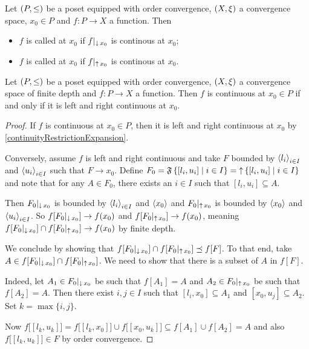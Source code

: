 \begin{definition}
Let $\left( P,\leq \right)$ be a poset equipped with order convergence, $\left( X,\xi \right)$ a convergence space, $x_0\in P$ and $f: P\to X$ a function. Then
\begin{itemize}
\item $f$ is called  at $x_0$ if $f|_{\operatorname{\downarrow} x_0}$ is continous at $x_0$;
\item $f$ is called  at $x_0$ if $f|_{\operatorname{\uparrow} x_0}$ is continous at $x_0$.
\end{itemize}
\end{definition}

\begin{proposition} \label{leftRightConvergence}
Let $\left( P,\leq \right)$ be a poset equipped with order convergence, $\left( X,\xi \right)$ a convergence space of finite depth and $f: P\to X$ a function. Then $f$ is continuous at $x_0\in P$ \textup{if and only if} it is left and right continuous at $x_0$.
\end{proposition}
\begin{proof}
If $f$ is continuous at $x_0\in P$, then it is left and right continuous at $x_0$ by \ref{continuityRestrictionExpansion}.

Conversely, assume $f$ is left and right continuous and take $F$ bounded by $\left\langle l_i \right\rangle_{i\in I}$ and $\left\langle u_i \right\rangle_{i\in I}$ such that $F\to x_0$. Define $F_0 = \mathfrak{F}\left\{ [l_i, u_i] \;\middle|\; i\in I \right\} = \operatorname{\uparrow} \left\{ [l_i, u_i] \;\middle|\; i\in I \right\}$ and note that for any $A\in F_0$, there exists an $i\in I$ such that $[l_i,u_i]\subseteq A$.


Then $F_0|_{\operatorname{\downarrow} x_0}$ is bounded by $\left\langle l_i \right\rangle_{i\in I}$ and $\left\langle x_0 \right\rangle$ and $F_0|_{\operatorname{\uparrow} x_0}$ is bounded by $\left\langle x_0 \right\rangle$ and $\left\langle u_i \right\rangle_{i\in I}$. So $f[F_0|_{\operatorname{\downarrow} x_0}] \to f(x_0)$ and $f[F_0|_{\operatorname{\uparrow} x_0}] \to f(x_0)$, meaning $f[F_0|_{\operatorname{\downarrow} x_0}]\cap f[F_0|_{\operatorname{\uparrow} x_0}] \to f(x_0)$ by finite depth.

We conclude by showing that $f[F_0|_{\operatorname{\downarrow} x_0}]\cap f[F_0|_{\operatorname{\uparrow} x_0}] \preceq f[F]$. To that end, take $A\in f[F_0|_{\operatorname{\downarrow} x_0}]\cap f[F_0|_{\operatorname{\uparrow} x_0}]$. We need to show that there is a subset of $A$ in $f[F]$.

Indeed, let $A_1\in F_0|_{\operatorname{\downarrow} x_0}$ be such that $f[A_1] = A$ and $A_2\in F_0|_{\operatorname{\uparrow} x_0}$ be such that $f[A_2] = A$.
Then there exist $i,j\in I$ such that $[l_i,x_0]\subseteq A_1$ and $[x_0, u_j]\subseteq A_2$. Set $k = \max\{i,j\}$.

Now $f\Big[[l_k,u_k]\Big] = f\Big[[l_k,x_0]\Big] \cup f\Big[[x_0,u_k]\Big]\subseteq f[A_1]\cup f[A_2] = A$ and also $f\Big[[l_k,u_k]\Big]\in F$ by order convergence.
\end{proof}

